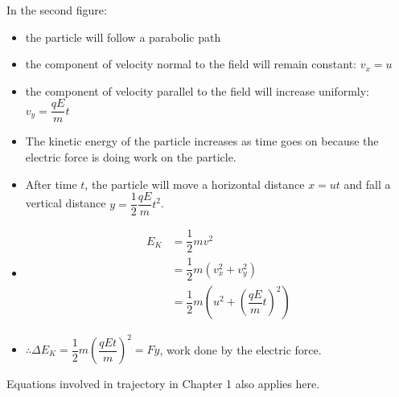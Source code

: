 \begin{center}
\begin{minipage}{0.48\textwidth}
  \end{minipage}
\end{center}
In the second figure:
\begin{itemize}
  \item the particle will follow a parabolic path
  \item the component of velocity normal to the field will remain constant: $v_x=u$
  \item the component of velocity parallel to the field will increase uniformly: $v_y=\dfrac{qE}{m}t$
  \item The kinetic energy of the particle increases as time goes on because the electric force is doing work on the particle.
  \item After time $t$, the particle will move a horizontal distance $x = ut$ and fall a vertical distance $y = \dfrac{1}{2}\dfrac{qE}{m}t^2$.
  \item $$ 
  \begin{aligned}
   E_K&= \dfrac{1}{2}mv^2\\
    &= \dfrac{1}{2}m\left(v_x^2+v_y^2\right)\\
    &= \dfrac{1}{2}m\left(u^2+\left(\dfrac{qE}{m}t\right)^2\right)
  \end{aligned} $$ 
  \item $\therefore \Delta E_K=\dfrac{1}{2}m\left(\dfrac{qEt}{m}\right)^2=Fy$, work done by the electric force.
\end{itemize}
Equations involved in trajectory in Chapter 1 also applies here. 
